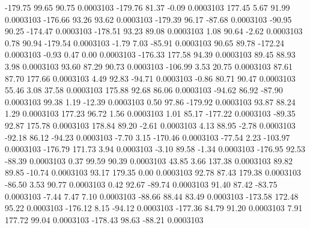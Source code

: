      -179.75       99.65       90.75     0.0003103
     -179.76       81.37       -0.09     0.0003103
      177.45        5.67       91.99     0.0003103
     -176.66       93.26       93.62     0.0003103
     -179.39       96.17      -87.68     0.0003103
      -90.95       90.25     -174.47     0.0003103
     -178.51       93.23       89.08     0.0003103
        1.08       90.64       -2.62     0.0003103
        0.78       90.94     -179.54     0.0003103
       -1.79        7.03      -85.91     0.0003103
       90.65       89.78     -172.24     0.0003103
       -0.93        0.47        0.00     0.0003103
     -176.33      177.58       94.39     0.0003103
       89.45       88.93        3.98     0.0003103
       93.60       87.29       90.73     0.0003103
     -106.99        3.53       20.75     0.0003103
       87.61       87.70      177.66     0.0003103
        4.49       92.83      -94.71     0.0003103
       -0.86       80.71       90.47     0.0003103
       55.46        3.08       37.58     0.0003103
      175.88       92.68       86.06     0.0003103
      -94.62       86.92      -87.90     0.0003103
       99.38        1.19      -12.39     0.0003103
        0.50       97.86     -179.92     0.0003103
       93.87       88.24        1.29     0.0003103
      177.23       96.72        1.56     0.0003103
        1.01       85.17     -177.22     0.0003103
      -89.35       92.87      175.78     0.0003103
      178.84       89.20       -2.61     0.0003103
        4.13       88.95       -2.78     0.0003103
      -92.18       86.12      -94.23     0.0003103
       -7.70        3.15     -170.46     0.0003103
      -77.54        2.23     -103.97     0.0003103
     -176.79      171.73        3.94     0.0003103
       -3.10       89.58       -1.34     0.0003103
     -176.95       92.53      -88.39     0.0003103
        0.37       99.59       90.39     0.0003103
       43.85        3.66      137.38     0.0003103
       89.82       89.85      -10.74     0.0003103
       93.17      179.35        0.00     0.0003103
       92.78       87.43      179.38     0.0003103
      -86.50        3.53       90.77     0.0003103
        0.42       92.67      -89.74     0.0003103
       91.40       87.42      -83.75     0.0003103
       -7.44        7.47        7.10     0.0003103
      -88.66       88.44       83.49     0.0003103
     -173.58      172.48       95.22     0.0003103
     -176.12        8.15      -94.12     0.0003103
     -177.36       84.79       91.20     0.0003103
        7.91      177.72       99.04     0.0003103
     -178.43       98.63      -88.21     0.0003103
